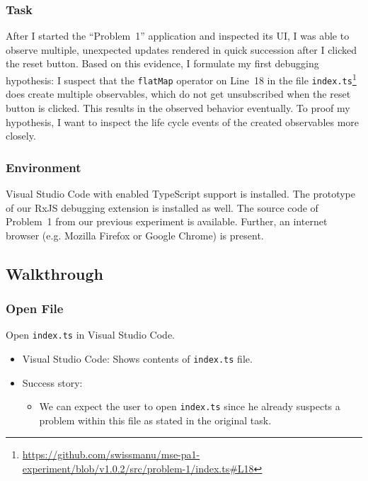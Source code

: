 \documentclass[sigplan,screen,nonacm,review]{acmart}
\begin{document}
\subsubsection{Task}

After I started the ``Problem~1'' application and inspected its UI, I was able to observe multiple, unexpected updates rendered in quick succession after I clicked the reset button. Based on this evidence, I formulate my first debugging hypothesis: I suspect that the \texttt{flatMap} operator on Line~18 in the file \texttt{index.ts}\footnote{\url{https://github.com/swissmanu/mse-pa1-experiment/blob/v1.0.2/src/problem-1/index.ts\#L18}} does create multiple observables, which do not get unsubscribed when the reset button is clicked. This results in the observed behavior eventually. To proof my hypothesis, I want to inspect the life cycle events of the created observables more closely.

\subsubsection{Environment}

Visual Studio Code with enabled TypeScript support is installed. The prototype of our RxJS debugging extension is installed as well. The source code of Problem~1 from our previous experiment is available. Further, an internet browser (e.g. Mozilla Firefox or Google Chrome) is present.

\subsection{Walkthrough}


\subsubsection{Open File}
Open \texttt{index.ts} in Visual Studio Code.

\begin{itemize}
	\item Visual Studio Code: Shows contents of \texttt{index.ts} file.
	\item Success story:
	      \begin{itemize}
	      	\item We can expect the user to open \texttt{index.ts} since he already suspects a problem within this file as stated in the original task.
	      \end{itemize}
\end{itemize}
\end{document}
